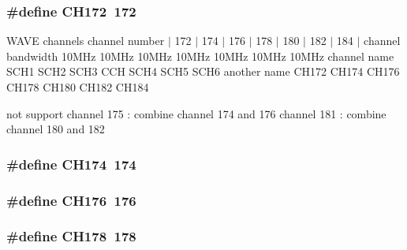 \subsubsection[{\texorpdfstring{C\+H172}{CH172}}]{\setlength{\rightskip}{0pt plus 5cm}\#define C\+H172~172}\hypertarget{channel-manager_8h_a5106ef73019b4b24c3e89a0605bc4686}{}\label{channel-manager_8h_a5106ef73019b4b24c3e89a0605bc4686}
W\+A\+VE channels channel number $\vert$ 172 $\vert$ 174 $\vert$ 176 $\vert$ 178 $\vert$ 180 $\vert$ 182 $\vert$ 184 $\vert$ channel bandwidth 10\+M\+Hz 10\+M\+Hz 10\+M\+Hz 10\+M\+Hz 10\+M\+Hz 10\+M\+Hz 10\+M\+Hz channel name S\+C\+H1 S\+C\+H2 S\+C\+H3 C\+CH S\+C\+H4 S\+C\+H5 S\+C\+H6 another name C\+H172 C\+H174 C\+H176 C\+H178 C\+H180 C\+H182 C\+H184

not support channel 175 \+: combine channel 174 and 176 channel 181 \+: combine channel 180 and 182 
\subsubsection[{\texorpdfstring{C\+H174}{CH174}}]{\setlength{\rightskip}{0pt plus 5cm}\#define C\+H174~174}\hypertarget{channel-manager_8h_ae2cb922871f4ffbc84b42eabd2b90c37}{}\label{channel-manager_8h_ae2cb922871f4ffbc84b42eabd2b90c37}
\subsubsection[{\texorpdfstring{C\+H176}{CH176}}]{\setlength{\rightskip}{0pt plus 5cm}\#define C\+H176~176}\hypertarget{channel-manager_8h_abc94c859f1ddfc781dad0604735c5394}{}\label{channel-manager_8h_abc94c859f1ddfc781dad0604735c5394}
\subsubsection[{\texorpdfstring{C\+H178}{CH178}}]{\setlength{\rightskip}{0pt plus 5cm}\#define C\+H178~178}\hypertarget{channel-manager_8h_a314aa5e24db20bcf2d64b72a9be09cf4}{}\label{channel-manager_8h_a314aa5e24db20bcf2d64b72a9be09cf4}
